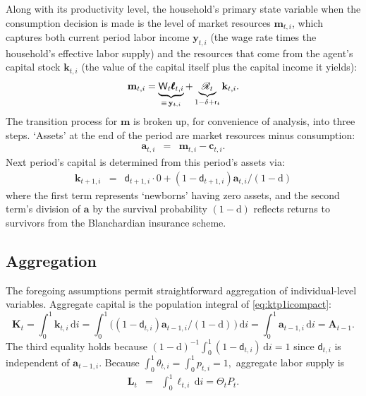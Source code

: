 \documentclass[titlepage]{article}
\begin{document}
Along with its productivity level, the household's primary state variable when the consumption decision is made is the level of market resources $\mathbf{m}_{t,i}$, which captures both current period labor income $\mathbf{y}_{t,i}$ (the wage rate times the household's effective labor supply) and the resources that come from the agent's capital stock $\mathbf{k}_{t,i}$ (the value of the capital itself plus the capital income it yields):
\begin{equation}
  \mathbf{m}_{t,i} = \underbrace{{\bf \mathsf{W}}_{t} \pmb{\ell}_{t,i}}_{\equiv\,\mathbf{y}_{t,i}} + \underbrace{{\mathscr{R}}_t}_{1-\delta+\mathsf{r}_{t}} \mathbf{k}_{t,i}.
\label{eq:mDef}
\end{equation}
 The transition process for $\mathbf{m}$ is broken up, for convenience
of analysis, into three steps.  `Assets' at the end of the period are
market resources minus consumption:
\begin{eqnarray}
   \mathbf{a}_{t,i} & = & \mathbf{m}_{t,i}-\mathbf{c}_{t,i}. \label{eq:aDef}
\end{eqnarray}
 Next period's capital is determined from this period's assets via:
\begin{eqnarray}
\mathbf{k}_{t+1,i} & = & \mathsf{d}_{t+1,i} \cdot 0+ (1 - \mathsf{d}_{t+1,i})\mathbf{a}_{t,i} \big/(1-\mathrm{d}) \label{eq:ktp1icompact}
\end{eqnarray}
where the first term represents `newborns' having zero assets, and the second term's division of $\mathbf{a}$ by the survival probability $(1-\mathrm{d})$ reflects returns to survivors from the Blanchardian insurance scheme.

\subsection{Aggregation}

The foregoing assumptions permit straightforward aggregation of individual-level variables.  Aggregate capital is the population integral of \eqref{eq:ktp1icompact}:
\begin{equation}
\mathbf{K}_{t} = \int_{0}^{1} \mathbf{k}_{t,i}\,\text{d}i = \int_{0}^{1} \big((1 - \mathsf{d}_{t,i})\mathbf{a}_{t-1,i} \big/(1-\mathrm{d})\, \big)\,\text{d}i = \int_{0}^{1} \mathbf{a}_{t-1,i}\,\text{d}i = \mathbf{A}_{t-1}.   \label{eq:Ktp1}
\end{equation}
 The third equality holds because $(1-\mathrm{d})^{-1}\int_{0}^{1}(1-\mathsf{d}_{t,i})\,\text{d}i = 1$
since $\mathsf{d}_{t,i}$ is independent of $\mathbf{a}_{t-1,i}$.
Because $\int_{0}^{1} \theta_{t,i} = \int_{0}^{1} {p}_{t,i} = 1,$ aggregate labor supply
is
\begin{eqnarray}
  \label{eq:Lt}
  \mathbf{L}_{t} & = & \int_{0}^{1} \pmb{\ell}_{t,i}\,\text{d}i = \Theta_{t} {P}_{t}.
\end{eqnarray}
\end{document}
